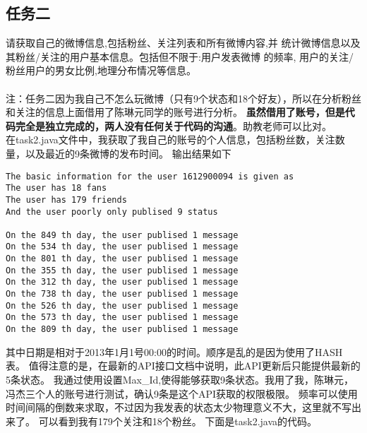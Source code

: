 \documentclass{article}
\begin{document}
\subsection{任务二}
请获取自己的微博信息,包括粉丝、关注列表和所有微博内容,并
统计微博信息以及其粉丝/关注的用户基本信息。包括但不限于:用户发表微博
的频率, 用户的关注/粉丝用户的男女比例,地理分布情况等信息。\\\\
注：任务二因为我自己不怎么玩微博（只有9个状态和18个好友），所以在分析粉丝和关注的信息上面借用了陈琳元同学的账号进行分析。
\textbf{虽然借用了账号，但是代码完全是独立完成的，两人没有任何关于代码的沟通}。助教老师可以比对。
\\在task2.java文件中，我获取了我自己的账号的个人信息，包括粉丝数，关注数量，以及最近的9条微博的发布时间。
输出结果如下
\begin{lstlisting}
The basic information for the user 1612900094 is given as
The user has 18 fans
The user has 179 friends
And the user poorly only publised 9 status

On the 849 th day, the user publised 1 message
On the 534 th day, the user publised 1 message
On the 801 th day, the user publised 1 message
On the 355 th day, the user publised 1 message
On the 312 th day, the user publised 1 message
On the 738 th day, the user publised 1 message
On the 526 th day, the user publised 1 message
On the 573 th day, the user publised 1 message
On the 809 th day, the user publised 1 message
\end{lstlisting}
其中日期是相对于2013年1月1号00:00的时间。顺序是乱的是因为使用了HASH表。
值得注意的是，在最新的API接口文档中说明，此API更新后只能提供最新的5条状态。
我通过使用设置Max\_Id,使得能够获取9条状态。我用了我，陈琳元，冯杰三个人的账号进行测试，确认9条是这个API获取的权限极限。
频率可以使用时间间隔的倒数来求取，不过因为我发表的状态太少物理意义不大，这里就不写出来了。
可以看到我有179个关注和18个粉丝。
下面是task2.java的代码。
\end{document}
